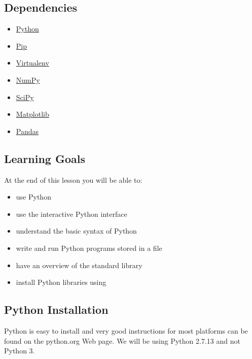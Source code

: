 \subsection{Dependencies}
\label{\detokenize{lesson/prg/python_intro:dependencies}}\begin{itemize}
\item {} 
\href{https://www.python.org/}{Python}

\item {} 
\href{https://pip.pypa.io/en/stable/}{Pip}

\item {} 
\href{https://virtualenv.pypa.io/en/stable/}{Virtualenv}

\item {} 
\href{http://www.numpy.org/}{NumPy}

\item {} 
\href{https://scipy.org/}{SciPy}

\item {} 
\href{http://matplotlib.org/}{Matplotlib}

\item {} 
\href{http://pandas.pydata.org/}{Pandas}

\end{itemize}


\subsection{Learning Goals}
\label{\detokenize{lesson/prg/python_intro:learning-goals}}
At the end of this lesson you will be able to:
\begin{itemize}
\item {} 
use Python

\item {} 
use the interactive Python interface

\item {} 
understand the basic syntax of Python

\item {} 
write and run Python programs stored in a file

\item {} 
have an overview of the standard library

\item {} 
install Python libraries using 

\end{itemize}


\subsection{Python Installation}
\label{\detokenize{lesson/prg/python_intro:python-installation}}
Python is easy to install and very good instructions for most
platforms can be found on the python.org Web page. We will be using
Python 2.7.13 and not Python 3.

